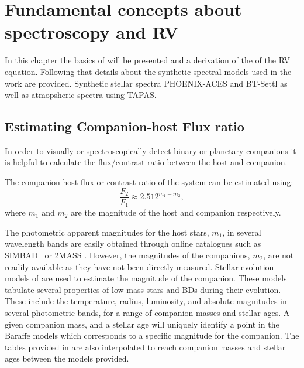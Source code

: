 
\chapter{Fundamental concepts about spectroscopy and RV}
\label{cha:concepts}

In this chapter the basics of \nir{} will be presented and a derivation of the of the RV equation. Following that details about the synthetic spectral models used in the work are provided. Synthetic stellar spectra {PHOENIX-ACES} and {BT-Settl} as well as atmopsheric spectra using {TAPAS}.











\section{Estimating Companion-host Flux ratio}
\label{sec:compaion_flux_ratio}
In order to visually or spectroscopically detect binary or planetary companions it is helpful to calculate the flux/contrast ratio between the host and companion.

The companion-host flux or contrast ratio of the system can be estimated using:
\begin{equation}
\frac{F_{2}}{F_{1}} \approx 2.512^{m_{1} - m_{2}}, \label{eqn:mag_flux_ratios}
\end{equation}
where \(m_{1}\) and \(m_{2}\) are the magnitude of the host and companion respectively.

The photometric apparent magnitudes for the host stars, \(m_{1}\), in several wavelength bands are easily obtained through online catalogues such as {SIMBAD}~\citep{wenger_simbad_2000} or {2MASS} \citep{skrutskie_two_2006}.
However, the magnitudes of the companions, \(m_{2}\), are not readily available as they have not been directly measured.
Stellar evolution models of \citet{baraffe_evolutionary_2003, baraffe_new_2015} are used to estimate the magnitude of the companion.
These models tabulate several properties of low-mass stars and BDs during their evolution.
These include the temperature, radius, luminosity, and absolute magnitudes in several photometric bands, for a range of companion masses and stellar ages.
A given companion mass, and a stellar age will uniquely identify a point in the Baraffe models which corresponds to a specific magnitude for the companion.
The tables provided in \citet{baraffe_evolutionary_2003, baraffe_new_2015} are also interpolated to reach companion masses and stellar ages between the models provided.

